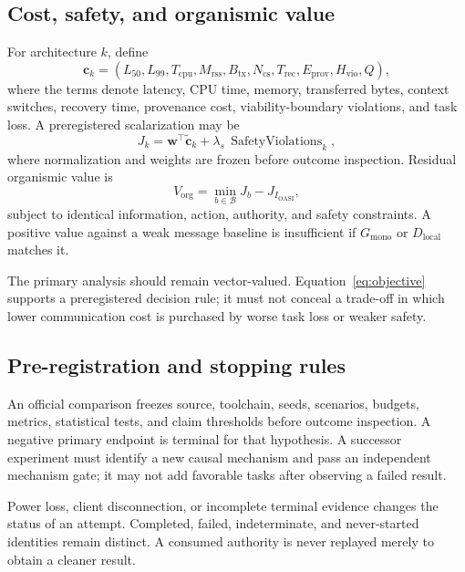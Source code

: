 \documentclass[journal,10pt]{IEEEtran}
\begin{document}
\subsection{Cost, safety, and organismic value}
For architecture $k$, define
\begin{equation}
\mathbf c_k=
(L_{50},L_{99},T_{\mathrm{cpu}},M_{\mathrm{rss}},B_{\mathrm{tx}},
N_{\mathrm{cs}},T_{\mathrm{rec}},E_{\mathrm{prov}},H_{\mathrm{vio}},Q),
\label{eq:costvector}
\end{equation}
where the terms denote latency, CPU time, memory, transferred bytes, context switches, recovery time, provenance cost, viability-boundary violations, and task loss. A preregistered scalarization may be
\begin{equation}
J_k=\mathbf w^\top\widetilde{\mathbf c}_k
+\lambda_s\,\operatorname{SafetyViolations}_k,
\label{eq:objective}
\end{equation}
where normalization and weights are frozen before outcome inspection. Residual organismic value is
\begin{equation}
V_{\mathrm{org}}=\min_{b\in\mathcal B}J_b-J_{I_{\mathrm{OASI}}},
\label{eq:value}
\end{equation}
subject to identical information, action, authority, and safety constraints. A positive value against a weak message baseline is insufficient if $G_{\mathrm{mono}}$ or $D_{\mathrm{local}}$ matches it.

The primary analysis should remain vector-valued. Equation~\eqref{eq:objective} supports a preregistered decision rule; it must not conceal a trade-off in which lower communication cost is purchased by worse task loss or weaker safety.

\subsection{Pre-registration and stopping rules}
An official comparison freezes source, toolchain, seeds, scenarios, budgets, metrics, statistical tests, and claim thresholds before outcome inspection. A negative primary endpoint is terminal for that hypothesis. A successor experiment must identify a new causal mechanism and pass an independent mechanism gate; it may not add favorable tasks after observing a failed result.

Power loss, client disconnection, or incomplete terminal evidence changes the status of an attempt. Completed, failed, indeterminate, and never-started identities remain distinct. A consumed authority is never replayed merely to obtain a cleaner result.
\end{document}
